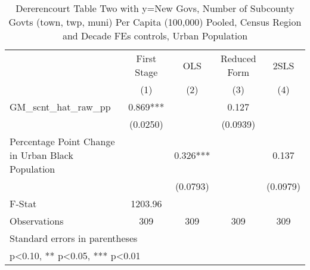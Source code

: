 \begin{table}[htbp]\centering
\def\sym#1{\ifmmode^{#1}\else\(^{#1}\)\fi}
\caption{Dererencourt Table Two with y=New Govs, Number of Subcounty Govts (town, twp, muni) Per Capita (100,000) Pooled, Census Region and Decade FEs controls, Urban Population}
\begin{tabular}{l*{4}{c}}
\toprule
                    & First Stage   &         OLS   &Reduced Form   &        2SLS   \\
                    &\multicolumn{1}{c}{(1)}   &\multicolumn{1}{c}{(2)}   &\multicolumn{1}{c}{(3)}   &\multicolumn{1}{c}{(4)}   \\
\midrule
GM\_scnt\_hat\_raw\_pp  &       0.869***&               &       0.127   &               \\
                    &    (0.0250)   &               &    (0.0939)   &               \\
\addlinespace
Percentage Point Change in Urban Black Population&               &       0.326***&               &       0.137   \\
                    &               &    (0.0793)   &               &    (0.0979)   \\
\midrule
F-Stat              &     1203.96   &               &               &               \\
Observations        &         309   &         309   &         309   &         309   \\
\bottomrule
\multicolumn{5}{l}{\footnotesize Standard errors in parentheses}\\
\multicolumn{5}{l}{\footnotesize * p<0.10, ** p<0.05, *** p<0.01}\\
\end{tabular}
\end{table}
